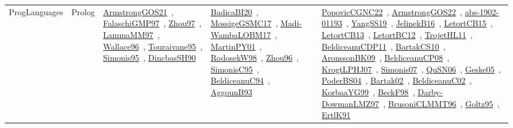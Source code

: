{\begin{longtable}{lp{3cm}>{\raggedright\arraybackslash}p{6cm}>{\raggedright\arraybackslash}p{6cm}>{\raggedright\arraybackslash}p{8cm}}
ProgLanguages & Prolog & \href{works/ArmstrongGOS21.pdf}{ArmstrongGOS21}~\cite{ArmstrongGOS21}, \href{works/FalaschiGMP97.pdf}{FalaschiGMP97}~\cite{FalaschiGMP97}, \href{works/Zhou97.pdf}{Zhou97}~\cite{Zhou97}, \href{works/LammaMM97.pdf}{LammaMM97}~\cite{LammaMM97}, \href{works/Wallace96.pdf}{Wallace96}~\cite{Wallace96}, \href{works/Touraivane95.pdf}{Touraivane95}~\cite{Touraivane95}, \href{works/Simonis95.pdf}{Simonis95}~\cite{Simonis95}, \href{works/DincbasSH90.pdf}{DincbasSH90}~\cite{DincbasSH90} & \href{works/BadicaBI20.pdf}{BadicaBI20}~\cite{BadicaBI20}, \href{works/MossigeGSMC17.pdf}{MossigeGSMC17}~\cite{MossigeGSMC17}, \href{works/Madi-WambaLOBM17.pdf}{Madi-WambaLOBM17}~\cite{Madi-WambaLOBM17}, \href{works/MartinPY01.pdf}{MartinPY01}~\cite{MartinPY01}, \href{works/RodosekW98.pdf}{RodosekW98}~\cite{RodosekW98}, \href{works/Zhou96.pdf}{Zhou96}~\cite{Zhou96}, \href{works/SimonisC95.pdf}{SimonisC95}~\cite{SimonisC95}, \href{works/BeldiceanuC94.pdf}{BeldiceanuC94}~\cite{BeldiceanuC94}, \href{works/AggounB93.pdf}{AggounB93}~\cite{AggounB93} & \href{works/PopovicCGNC22.pdf}{PopovicCGNC22}~\cite{PopovicCGNC22}, \href{works/ArmstrongGOS22.pdf}{ArmstrongGOS22}~\cite{ArmstrongGOS22}, \href{works/abs-1902-01193.pdf}{abs-1902-01193}~\cite{abs-1902-01193}, \href{works/YangSS19.pdf}{YangSS19}~\cite{YangSS19}, \href{works/JelinekB16.pdf}{JelinekB16}~\cite{JelinekB16}, \href{works/LetortCB15.pdf}{LetortCB15}~\cite{LetortCB15}, \href{works/LetortCB13.pdf}{LetortCB13}~\cite{LetortCB13}, \href{works/LetortBC12.pdf}{LetortBC12}~\cite{LetortBC12}, \href{works/TrojetHL11.pdf}{TrojetHL11}~\cite{TrojetHL11}, \href{works/BeldiceanuCDP11.pdf}{BeldiceanuCDP11}~\cite{BeldiceanuCDP11}, \href{works/BartakCS10.pdf}{BartakCS10}~\cite{BartakCS10}, \href{works/AronssonBK09.pdf}{AronssonBK09}~\cite{AronssonBK09}, \href{works/BeldiceanuCP08.pdf}{BeldiceanuCP08}~\cite{BeldiceanuCP08}, \href{works/KrogtLPHJ07.pdf}{KrogtLPHJ07}~\cite{KrogtLPHJ07}, \href{works/Simonis07.pdf}{Simonis07}~\cite{Simonis07}, \href{works/QuSN06.pdf}{QuSN06}~\cite{QuSN06}, \href{works/Geske05.pdf}{Geske05}~\cite{Geske05}, \href{works/PoderBS04.pdf}{PoderBS04}~\cite{PoderBS04}, \href{works/Bartak02.pdf}{Bartak02}~\cite{Bartak02}, \href{works/BeldiceanuC02.pdf}{BeldiceanuC02}~\cite{BeldiceanuC02}, \href{works/KorbaaYG99.pdf}{KorbaaYG99}~\cite{KorbaaYG99}, \href{works/BeckF98.pdf}{BeckF98}~\cite{BeckF98}, \href{works/Darby-DowmanLMZ97.pdf}{Darby-DowmanLMZ97}~\cite{Darby-DowmanLMZ97}, \href{works/BrusoniCLMMT96.pdf}{BrusoniCLMMT96}~\cite{BrusoniCLMMT96}, \href{works/Goltz95.pdf}{Goltz95}~\cite{Goltz95}, \href{works/ErtlK91.pdf}{ErtlK91}~\cite{ErtlK91}\\

\end{longtable}}
